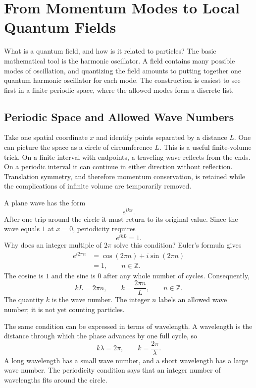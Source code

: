 \chapter{From Momentum Modes to Local Quantum Fields}

What is a quantum field, and how is it related to particles? The basic mathematical tool is the harmonic oscillator. A field contains many possible modes of oscillation, and quantizing the field amounts to putting together one quantum harmonic oscillator for each mode. The construction is easiest to see first in a finite periodic space, where the allowed modes form a discrete list.

\section{Periodic Space and Allowed Wave Numbers}

Take one spatial coordinate \(x\) and identify points separated by a distance \(L\). One can picture the space as a circle of circumference \(L\). This is a useful finite-volume trick. On a finite interval with endpoints, a traveling wave reflects from the ends. On a periodic interval it can continue in either direction without reflection. Translation symmetry, and therefore momentum conservation, is retained while the complications of infinite volume are temporarily removed.

A plane wave has the form
\begin{equation}
e^{ikx}.
\end{equation}
After one trip around the circle it must return to its original value. Since the wave equals \(1\) at \(x=0\), periodicity requires
\begin{equation}
e^{ikL}=1.
\end{equation}
Why does an integer multiple of \(2\pi\) solve this condition? Euler's formula gives
\begin{align}
e^{i2\pi n}
&=\cos(2\pi n)+i\sin(2\pi n)\\
&=1,
\qquad n\in\mathbb Z.
\end{align}
The cosine is \(1\) and the sine is \(0\) after any whole number of cycles. Consequently,
\begin{equation}
kL=2\pi n,
\qquad
k=\frac{2\pi n}{L},
\qquad n\in\mathbb Z.
\end{equation}
The quantity \(k\) is the wave number. The integer \(n\) labels an allowed wave number; it is not yet counting particles.

The same condition can be expressed in terms of wavelength. A wavelength is the distance through which the phase advances by one full cycle, so
\begin{equation}
k\lambda=2\pi,
\qquad
k=\frac{2\pi}{\lambda}.
\end{equation}
A long wavelength has a small wave number, and a short wavelength has a large wave number. The periodicity condition says that an integer number of wavelengths fits around the circle.

